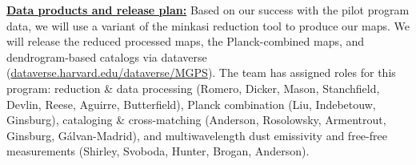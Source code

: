 \documentclass[11pt,preprint]{aastex_nofoot}
\begin{document}
\indent\underline{\textbf{\helv Data products and release plan:}}
Based on our success with the pilot program data, we will use a variant of the
minkasi reduction tool to produce our maps.  We will release the reduced
processed maps, the Planck-combined maps, and dendrogram-based catalogs via
dataverse (\url{dataverse.harvard.edu/dataverse/MGPS}).  The team has assigned
roles for this program: reduction \& data processing (Romero, Dicker, Mason,
Stanchfield, Devlin, Reese, Aguirre, Butterfield), Planck combination (Liu,
Indebetouw, Ginsburg),  cataloging \& cross-matching (Anderson, Rosolowsky,
Armentrout, Ginsburg, G{\'a}lvan-Madrid), and multiwavelength dust emissivity
and free-free measurements (Shirley, Svoboda, Hunter, Brogan, Anderson).




\end{document}
